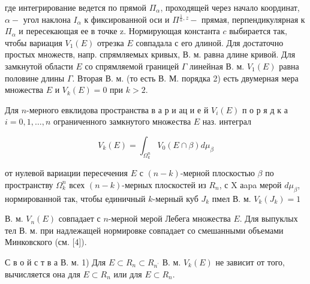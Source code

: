 \documentclass[10pt]{article}
\begin{document}
где интегрирование ведется по прямой $\Pi_{\alpha}$, проходящей через начало координат, $\alpha-$ угол наклона $I_{\alpha}$ к фиксированной оси и $\Pi \stackrel{\frac{1}{\alpha}, z}{ }-$ прямая, перпендикулярная к $\Pi_{\alpha}$ и пересекающая ее в точке z. Нормирующая константа $c$ выбирается так, чтобы вариация $V_{1}(E)$ отрезка $E$ совпадала с его длиной. Для достаточно простых множеств, напр. спрямляемых кривых, В. м. равна длине кривой. Для замкнутой области $E$ со спрямляемой границей $\Gamma$ линейная В. м. $V_{1}(E)$ равна половине длины $\Gamma$. Вторая В. м. (то есть В. М. порядка 2) есть двумерная мера множества $E$ и $V_{k}(E)=0$ при $k>2$.



Для $n$-мерного евклидова пространства в а р и ац и е й $V_{i}(E)$ п о р я д к а $i=0,1, \ldots, n$ ограниченного замкнутого множества $E$ наз. интеграл



\[

V_{k}(E)=\int_{\Omega_{k}^{n}} V_{0}(E \cap \beta) d \mu_{\beta}

\]



от нулевой вариации пересечения $E$ с $(n-k)$-мерной плоскостью $\beta$ по пространству $\Omega_{k}^{n}$ всех $(n-k)$-мерных плоскостей из $R_{n}$, с X аapa мерой $d \mu_{\beta}$, нормированной так, чтобы единичный $k$-мерный куб $J_{k}$ пмел В. м. $V_{k}\left(J_{k}\right)=1$



В. м. $V_{n}(E)$ совпадает с $n$-мерной мерой Лебега множества $E$. Для выпуклых тел В. м. при надлежащей нормировке совпадает со смешанными объемами Минковского (см. [4]).



С в о й с т в а В. м. 1) Для $E \subset R_{n} \subset R_{n^{\prime}}$ В. м. $V_{k}(E)$ не зависит от того, вычисляется она для $E \subset R_{n}$ или для $E \subset R_{n}$.
\end{document}

